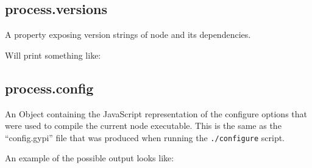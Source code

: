 \subsection{process.versions}\label{process.versions}

A property exposing version strings of node and its dependencies.

\begin{Shaded}
\begin{Highlighting}[]
\NormalTok{(}\NormalTok{);}
\end{Highlighting}
\end{Shaded}

Will print something like:

\begin{Shaded}
\begin{Highlighting}[]
\NormalTok{\{ }\NormalTok{: }\NormalTok{,}
  \NormalTok{: }\NormalTok{,}
  \NormalTok{: }\NormalTok{,}
  \NormalTok{: }\NormalTok{,}
  \NormalTok{: }\NormalTok{,}
  \NormalTok{: }\NormalTok{,}
  \NormalTok{: }\NormalTok{,}
  \NormalTok{: } \NormalTok{\}}
\end{Highlighting}
\end{Shaded}

\subsection{process.config}\label{process.config}

An Object containing the JavaScript representation of the configure
options that were used to compile the current node executable. This is
the same as the ``config.gypi'' file that was produced when running the
\texttt{./configure} script.

An example of the possible output looks like:

